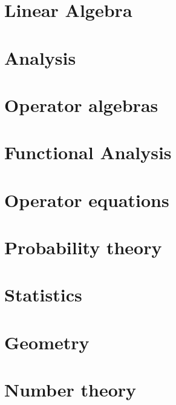 \documentclass{report}
\begin{document}
\part{Linear Algebra}
\setcounter{chapter}{0} %


\part{Analysis}
\setcounter{chapter}{0} %


\part{Operator algebras}
\setcounter{chapter}{0} %


\part{Functional Analysis}
\setcounter{chapter}{0} %



\part{Operator equations}
\setcounter{chapter}{0} %


\part{Probability theory}
\setcounter{chapter}{0} %


\part{Statistics}
\setcounter{chapter}{0} %


\part{Geometry}
\setcounter{chapter}{0} %


\part{Number theory}
\setcounter{chapter}{0} %

\end{document}
